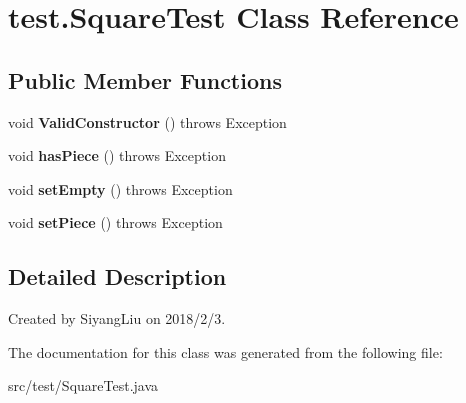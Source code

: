 \hypertarget{classtest_1_1_square_test}{}\section{test.\+Square\+Test Class Reference}
\label{classtest_1_1_square_test}
\subsection*{Public Member Functions}
\begin{DoxyCompactItemize}
\item 
\mbox{\label{classtest_1_1_square_test_ab07081393027fd9cb010d1462964b50d}} 
void {\bfseries Valid\+Constructor} ()  throws Exception 
\item 
\mbox{\label{classtest_1_1_square_test_aac6c93e458757bb97113b8add1e7594d}} 
void {\bfseries has\+Piece} ()  throws Exception 
\item 
\mbox{\label{classtest_1_1_square_test_ab6cf48f10c7b405f91a31b3fe2c584c2}} 
void {\bfseries set\+Empty} ()  throws Exception 
\item 
\mbox{\label{classtest_1_1_square_test_a0d8b4cea2196c5f51fcc1741d3945b0a}} 
void {\bfseries set\+Piece} ()  throws Exception 
\end{DoxyCompactItemize}


\subsection{Detailed Description}
Created by Siyang\+Liu on 2018/2/3. 

The documentation for this class was generated from the following file\+:\begin{DoxyCompactItemize}
\item 
src/test/Square\+Test.\+java\end{DoxyCompactItemize}
